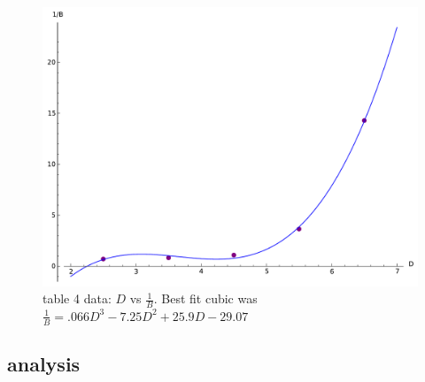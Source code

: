 \documentclass[12pt]{article}
\begin{document}
	\begin{figure}[hp]
	 \centering
	 \includegraphics[scale = .85]{plot4}
	 \caption*{table 4 data: $D$ vs $\frac{1}{B}$. Best fit cubic was $ \frac{1}{B} = .066D^3  - 7.25D^2 + 25.9D - 29.07 $}
	\end{figure} 
	\FloatBarrier

\subsection*{analysis}
 
\end{document}
